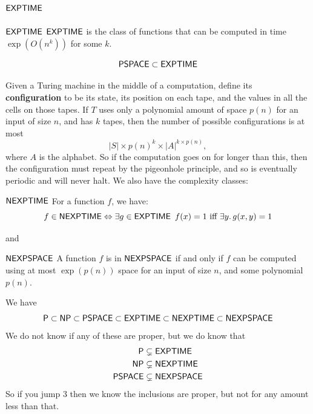 \documentclass{article}
\begin{document}
\subsection{$\mathsf{EXPTIME}$}
\begin{fancydefine}{$\mathsf{EXPTIME}$}
    $\mathsf{EXPTIME}$ is the class of functions that can be computed in time $\exp(O(n^{k}))$ for some $k$.
\end{fancydefine}
\newlec
\begin{fancyprop}{}
\[ \mathsf{PSPACE} \subset \mathsf{EXPTIME}\]
\end{fancyprop}
\proof Given a Turing machine in the middle of a computation, define its \textbf{configuration} to be its state, its position on each tape, and the values in all the cells on those tapes. \gap If $T$ uses only a polynomial amount of space $p(n)$ for an input of size $n$, and has $k$ tapes, then the number of possible configurations is at most \[|S| \times p(n)^{k} \times |A|^{k \times p(n)},\] where $A$ is the alphabet. So if the computation goes on for longer than this, then the configuration must repeat by the pigeonhole principle, and so is eventually periodic and will never halt. \endproof
We also have the complexity classes:
\begin{fancydefine}{$\mathsf{NEXPTIME}$}
    For a function $f$, we have:
    \[ f \in \mathsf{NEXPTIME} \Leftrightarrow \exists g \in \mathsf{EXPTIME} \,\,\, f(x)=1 \text{ iff } \exists y.\, g(x,y)=1\]
\end{fancydefine}
and \begin{fancydefine}{$\mathsf{NEXPSPACE}$}
    A function $f$ is in $\mathsf{NEXPSPACE}$ if and only if $f$ can be computed using at most $\exp(p(n))$ space for an input of size $n$, and some polynomial $p(n)$.
\end{fancydefine}
We have \[ \mathsf{P} \subset \mathsf{NP} \subset \mathsf{PSPACE} \subset \mathsf{EXPTIME} \subset \mathsf{NEXPTIME} \subset \mathsf{NEXPSPACE}\]
We do not know if any of these are proper, but we do know that \begin{align*}
    \mathsf{P} &\subsetneq \mathsf{EXPTIME}\\
    \mathsf{NP} &\subsetneq \mathsf{NEXPTIME}\\
    \mathsf{PSPACE} &\subsetneq \mathsf{NEXPSPACE}
\end{align*}
So if you jump $3$ then we know the inclusions are proper, but not for any amount less than that.
\end{document}
